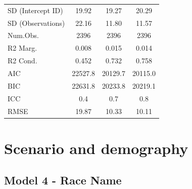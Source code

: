 \documentclass[]{report}
\begin{document}
\begin{table}
{\begin{tabular}[t]{lccc}
		SD (Intercept ID) & \num{19.92} & \num{19.27} & \num{20.29}\\
		SD (Observations) & \num{22.16} & \num{11.80} & \num{11.57}\\
		\midrule
		Num.Obs. & \num{2396} & \num{2396} & \num{2396}\\
		R2 Marg. & \num{0.008} & \num{0.015} & \num{0.014}\\
		R2 Cond. & \num{0.452} & \num{0.732} & \num{0.758}\\
		AIC & \num{22527.8} & \num{20129.7} & \num{20115.0}\\
		BIC & \num{22631.8} & \num{20233.8} & \num{20219.1}\\
		ICC & \num{0.4} & \num{0.7} & \num{0.8}\\
		RMSE & \num{19.87} & \num{10.33} & \num{10.11}\\
		\bottomrule
	\end{tabular}}
\end{table}




\part{Scenario and demography}

\chapter{Model 4 - Race Name}
\end{document}
